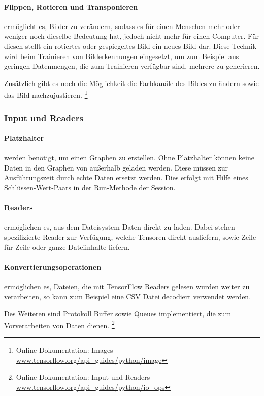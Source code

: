 \paragraph{Flippen, Rotieren und Transponieren} ermöglicht es, Bilder zu verändern, sodass es für einen Menschen mehr oder weniger noch dieselbe Bedeutung hat, jedoch nicht mehr für einen Computer. 
Für diesen stellt ein rotiertes oder gespiegeltes Bild ein neues Bild dar. 
Diese Technik wird beim Trainieren von Bilderkennungen eingesetzt, um zum Beispiel aus geringen Datenmengen, die zum Trainieren verfügbar sind, mehrere zu generieren. \phantom \newline

\noindent
Zusätzlich gibt es noch die Möglichkeit die Farbkanäle des Bildes zu ändern sowie das Bild nachzujustieren. 
\footnote{Online Dokumentation: Images \url{www.tensorflow.org/api_guides/python/image}}

\subsubsection{Input und Readers}

\paragraph{Platzhalter} werden benötigt, um einen Graphen zu erstellen. 
Ohne Platzhalter können keine Daten in den Graphen von außerhalb geladen werden. 
Diese müssen zur Ausführungszeit durch echte Daten ersetzt werden. 
Dies erfolgt mit Hilfe eines Schlüssen-Wert-Paars in der Run-Methode der Session. 

\paragraph{Readers} ermöglichen es, aus dem Dateisystem Daten direkt zu laden. 
Dabei stehen spezifizierte Reader zur Verfügung, welche Tensoren direkt ausliefern, sowie Zeile für Zeile  oder ganze Dateiinhalte liefern. 

\paragraph{Konvertierungsoperationen} ermöglichen es, Dateien, die mit TensorFlow Readers gelesen wurden weiter zu verarbeiten, so kann zum Beispiel eine CSV Datei decodiert verwendet werden.
\phantom \newline

\noindent
Des Weiteren sind Protokoll Buffer sowie Queues implementiert, die zum Vorverarbeiten von Daten dienen.
\footnote{Online Dokumentation: Input und Readers \url{www.tensorflow.org/api_guides/python/io_ops}}

